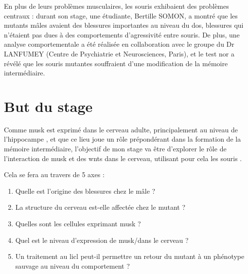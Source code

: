 	En plus de leurs problèmes musculaires, les souris \mcrd exhibaient des problèmes centraux : durant son stage, une étudiante, Bertille SOMON, a montré que les mutants mâles avaient des blessures importantes au niveau du dos, blessures qui n'étaient pas dues à des comportements d'agressivité entre souris. De plus, une analyse comportementale a été réalisée en collaboration avec le groupe du Dr LANFUMEY (Centre de Psychiatrie et Neurosciences, Paris), et le test \gls{nor} a révélé que les souris mutantes souffraient d'une modification de la mémoire intermédiaire.
		
\section{But du stage}
\label{sec:IntroBut}

Comme \gls{musk} est exprimé dans le cerveau adulte, principalement au niveau de l'hippocampe \cite{Garcia-Osta2006}, et que ce lieu joue un rôle prépondérant dans la formation de la mémoire intermédiaire, l'objectif de mon stage va être d'explorer le rôle de l'interaction de \gls{musk} et des \Glspl{wnt} dans le cerveau, utilisant pour cela les souris \mcrd.

Cela se fera au travers de 5 axes : 
\begin{enumerate}
	\item Quelle est l'origine des blessures chez le mâle ?
	\item La structure du cerveau est-elle affectée chez le mutant ?
	\item Quelles sont les cellules exprimant \gls{musk} ?
	\item Quel est le niveau d'expression de \gls{musk}/\mcrd dans le cerveau ?
	\item Un traitement au \gls{licl} peut-il permettre un retour du mutant à un phénotype sauvage au niveau du comportement ?
\end{enumerate}